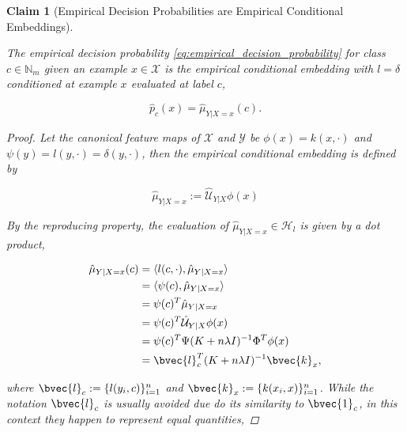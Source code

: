 \documentclass{article}
\newtheorem{claim}[theorem]{Claim}
\begin{document}
	\begin{claim}[Empirical Decision Probabilities are Empirical Conditional Embeddings]
	\label{thm:empirical_probability_is_embedding}
	
		The empirical decision probability \eqref{eq:empirical_decision_probability} for class $c \in \mathbb{N}_{m}$ given an example $x \in \mathcal{X}$ is the empirical conditional embedding with $l = \delta$ conditioned at example $x$ evaluated at label $c$,
			
		\begin{equation}
			\hat{p}_{c}(x) = \hat{\mu}_{Y | X = x}(c).
		\end{equation}
			
			
		\begin{proof}
			
			Let the canonical feature maps of $\mathcal{X}$ and $\mathcal{Y}$ be $\phi(x) = k(x, \cdot)$ and $\psi(y) = l(y, \cdot) = \delta(y, \cdot)$, then the empirical conditional embedding is defined by
			
			\begin{equation}
				\hat{\mu}_{Y | X = x} := \hat{\mathcal{U}}_{Y | X} \phi(x)
			\end{equation}
			
			By the reproducing property, the evaluation of $\hat{\mu}_{Y | X = x} \in \mathcal{H}_{l}$ is given by a dot product,
	
			\begin{equation}
			\begin{aligned}
				\hat{\mu}_{Y | X = x}(c) &= \langle l(c, \cdot), \hat{\mu}_{Y | X = x} \rangle \\
				&= \langle \psi(c), \hat{\mu}_{Y | X = x} \rangle \\
				&= \psi(c)^{T} \hat{\mu}_{Y | X = x} \\
				&= \psi(c)^{T} \hat{\mathcal{U}}_{Y | X} \phi(x) \\
				&= \psi(c)^{T} \Psi (K + n \lambda I)^{-1} \Phi^{T} \phi(x) \\
				&= \bvec{l}_{c}^{T} (K + n \lambda I)^{-1} \bvec{k}_{x}, \\
			\end{aligned}
			\end{equation}
			
			where $\bvec{l}_{c} := \{l(y_{i}, c)\}_{i = 1}^{n}$ and $\bvec{k}_{x} := \{k(x_{i}, x)\}_{i = 1}^{n}$. While the notation $\bvec{l}_{c}$ is usually avoided due do its similarity to $\bvec{1}_{c}$, in this context they happen to represent equal quantities,
			

\end{proof}
\end{claim}
\end{document}
